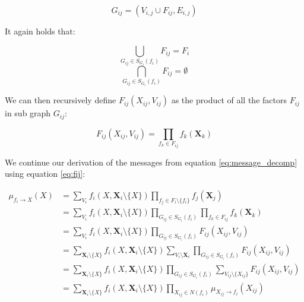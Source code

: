 \begin{equation}
G_{ij} = (V_{i,j} \cup F_{ij}, E_{i,j})
\end{equation}

\noindent
It again holds that:

\begin{multicols}{2}
\begin{equation}
\bigcup_{G_{ij} \in S_{G_i}(f_i)} F_{ij} = F_i 
\end{equation}\break
\begin{equation}
\bigcap_{G_{ij} \in S_{G_i}(f_i)} F_{ij} = \emptyset
\end{equation}
\end{multicols}

\noindent
We can then recursively define $F_{ij}(X_{ij}, V_{ij})$
as the product of all the factors $F_{ij}$ in sub graph $G_{ij}$:

\begin{equation}\label{eq:fij}
F_{ij}(X_{ij}, V_{ij}) = \prod_{f_{k} \in F_{ij}}f_{k}(\textbf{X}_{k})
\end{equation}

\noindent
We continue our derivation of the messages from equation 
\ref{eq:message_decomp} using equation \ref{eq:fij}:

\begin{equation}\label{eq:message_var_to_fact_der}\begin{split}
\mu_{f_i \rightarrow X} (X)
	&= \sum_{V_i}f_i(X, \textbf{X}_i \setminus \{X\}) 
		\prod_{f_j \in F_i \setminus \{f_i\}} f_j(\textbf{X}_j)\\
	&= \sum_{V_i}f_i(X, \textbf{X}_i \setminus \{X\}) 
		\prod_{G_{ij} \in S_{G_i}(f_i)} \prod_{f_{k} \in F_{ij} }
			f_{k}(\textbf{X}_k)\\
	&= \sum_{V_i}f_i(X, \textbf{X}_i \setminus \{X\}) 
		\prod_{G_{ij} \in S_{G_i}(f_i)} F_{ij}(X_{ij}, V_{ij})\\
	&= \sum_{\textbf{X}_i\setminus \{X\}} f_i(X, \textbf{X}_i \setminus \{X\}) 
		\sum_{V_i \setminus \textbf{X}_i}\prod_{G_{ij} \in S_{G_i}(f_i)} 
			F_{ij}(X_{ij}, V_{ij})\\
	&= \sum_{\textbf{X}_i\setminus \{X\}} f_i(X, \textbf{X}_i \setminus \{X\}) 
		\prod_{G_{ij} \in S_{G_i}(f_i)} \sum_{V_{ij} \setminus \{X_{ij}\}}
			F_{ij}(X_{ij}, V_{ij})\\
	&= \sum_{\textbf{X}_i\setminus \{X\}} f_i(X, \textbf{X}_i \setminus \{X\}) 
		\prod_{X_{ij} \in N(f_i)} \mu_{X_{ij} \rightarrow f_i}(X_{ij})
\end{split}\end{equation}

